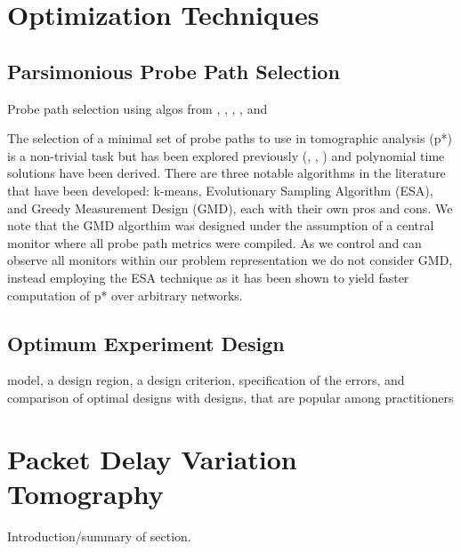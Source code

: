 \section{Optimization Techniques}
\label{sec:Boptimization}

\subsection{Parsimonious Probe Path Selection}
\label{ssec:Bparsppselection}
Probe path selection using algos from \cite{lawrence_network_2006}, \cite{rahali_unicast_2019}, \cite{k_deng_delay_2012}, \cite{rahali_unicast_2019}, and \cite{tootaghaj_parsimonious_2018}

The selection of a minimal set of probe paths to use in tomographic analysis (\gls{p*}) is a non-trivial task but has been explored previously (\cite{tootaghaj_parsimonious_2018}, \cite{rahali_unicast_2019}, \cite{he_distributed_2018}) and polynomial time solutions have been derived. There are three notable algorithms in the literature that have been developed: k-means, Evolutionary Sampling Algorithm (ESA), and Greedy Measurement Design (GMD), each with their own pros and cons. We note that the GMD algorthim was designed under the assumption of a central monitor where all probe path metrics were compiled. As we control and can observe all monitors within our problem representation we do not consider GMD, instead employing the ESA technique as it has been shown to yield faster computation of \gls{p*} over arbitrary networks.
    
\subsection{Optimum Experiment Design}
\label{ssec:Boptimumdesigns}

model, a design region, a design criterion, specification of the errors, and comparison of optimal designs with designs, that are popular among practitioners 

\section{Packet Delay Variation Tomography}
\label{sec:Bpdvtomography}
\begin{mdframed}Introduction/summary of section.\end{mdframed}

